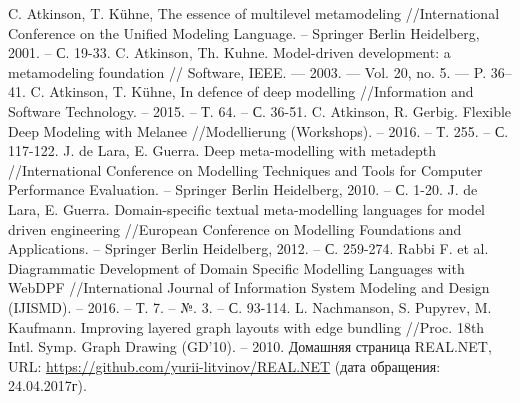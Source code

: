 \documentclass{spisok-article}
\begin{document}
\begin{thebibliography}{8}
	 C. Atkinson, T. Kühne, The essence of multilevel metamodeling //International Conference on the Unified Modeling Language. -- Springer Berlin Heidelberg, 2001. -- С. 19-33.
	 C. Atkinson, Th. Kuhne. Model-driven development: a metamodeling foundation // Software, IEEE. –– 2003. –– Vol. 20, no. 5. –– P. 36–41.
	 C. Atkinson, T. Kühne, In defence of deep modelling //Information and Software Technology. -- 2015. -- Т. 64. -- С. 36-51.
	 C. Atkinson, R. Gerbig. Flexible Deep Modeling with Melanee //Modellierung (Workshops). -- 2016. -- Т. 255. -- С. 117-122.
	 J. de Lara, E. Guerra. Deep meta-modelling with metadepth //International Conference on Modelling Techniques and Tools for Computer Performance Evaluation. -- Springer Berlin Heidelberg, 2010. -- С. 1-20.
	 J. de Lara, E. Guerra. Domain-specific textual meta-modelling languages for model driven engineering //European Conference on Modelling Foundations and Applications. -- Springer Berlin Heidelberg, 2012. -- С. 259-274.
	 Rabbi F. et al. Diagrammatic Development of Domain Specific Modelling Languages with WebDPF //International Journal of Information System Modeling and Design (IJISMD). -- 2016. -- Т. 7. -- №. 3. -- С. 93-114.
	 L. Nachmanson, S. Pupyrev, M. Kaufmann. Improving layered graph layouts with edge bundling //Proc. 18th Intl. Symp. Graph Drawing (GD’10). -- 2010.
	 Домашняя страница REAL.NET, URL: \url{https://github.com/yurii-litvinov/REAL.NET} (дата обращения: 24.04.2017г).
\end{thebibliography}
\end{document}
